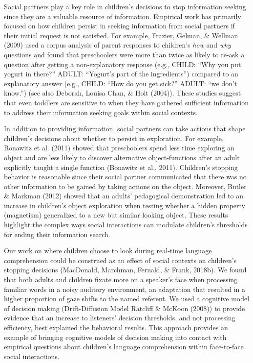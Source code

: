 \documentclass[oneside]{report}
\begin{document}
Social partners play a key role in children's decisions to stop
information seeking since they are a valuable resource of information.
Empirical work has primarily focused on how children persist in seeking
information from social partners if their initial request is not
satisfied. For example, Frazier, Gelman, \& Wellman (2009) used a corpus
analysis of parent responses to children's \emph{how} and \emph{why}
questions and found that preschoolers were more than twice as likely to
re-ask a question after getting a non-explanatory response (e.g., CHILD:
``Why you put yogurt in there?'' ADULT: ``Yogurt's part of the
ingredients'') compared to an explanatory answer (e.g., CHILD: ``How do
you get sick?'' ADULT: ``we don't know.'') (see also Deborah, Louisa
Chan, \& Holt (2004)). These studies suggest that even toddlers are
sensitive to when they have gathered sufficient information to address
their information seeking goals within social contexts.

In addition to providing information, social partners can take actions
that shape children's decisions about whether to persist in exploration.
For example, Bonawitz et al. (2011) showed that preschoolers spend less
time exploring an object and are less likely to discover alternative
object-functions after an adult explicitly taught a single function
(Bonawitz et al., 2011). Children's stopping behavior is reasonable
since their social partner communicated that there was no other
information to be gained by taking actions on the object. Moreover,
Butler \& Markman (2012) showed that an adults' pedagogical
demonstration led to an increase in children's object exploration when
testing whether a hidden property (magnetism) generalized to a new but
similar looking object. These results highlight the complex ways social
interactions can modulate children's thresholds for ending their
information search.

Our work on where children choose to look during real-time language
comprehension could be construed as an effect of social contexts on
children's stopping decisions (MacDonald, Marchman, Fernald, \& Frank,
2018b). We found that both adults and children fixate more on a
speaker's face when processing familiar words in a noisy auditory
environment, an adaptation that resulted in a higher proportion of gaze
shifts to the named referent. We used a cognitive model of decision
making (Drift-Diffusion Model Ratcliff \& McKoon (2008)) to provide
evidence that an increase to listeners' decision thresholds, and not
processing efficiency, best explained the behavioral results. This
approach provides an example of bringing cognitive models of decision
making into contact with empirical questions about children's language
comprehension within face-to-face social interactions.
\end{document}
